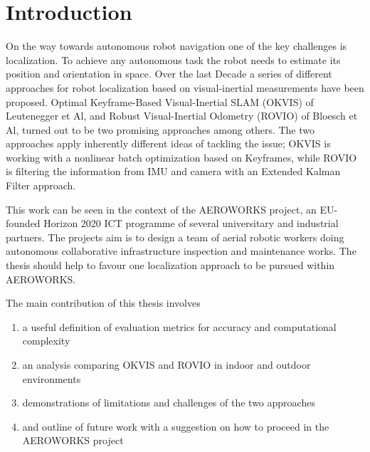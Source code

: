 \chapter{Introduction}
\label{sec:introduction}

On the way towards autonomous robot navigation one of the key challenges is localization. To achieve any autonomous task the robot needs to estimate its position and orientation in space. Over the last Decade a series of different approaches for robot localization based on visual-inertial measurements have been proposed. Optimal Keyframe-Based Visual-Inertial SLAM (OKVIS) of Leutenegger et Al, \cite{leutenegger2013keyframe} \cite{leutenegger2015keyframe} and Robust Visual-Inertial Odometry (ROVIO) of Bloesch et Al, \cite{bloeschrobust} turned out to be two promising approaches among others. The two approaches apply inherently different ideas of tackling the issue; OKVIS is working with a nonlinear batch optimization based on Keyframes, while ROVIO is filtering the information from IMU and camera with an Extended Kalman Filter approach.

This work can be seen in the context of the AEROWORKS project, an EU-founded Horizon 2020 ICT programme of several universitary and industrial partners. The projects aim is to design a team of aerial robotic workers doing autonomous collaborative infrastructure inspection and maintenance works. The thesis should help to favour one localization approach to be pursued within AEROWORKS.

The main contribution of this thesis involves

\begin{enumerate}
\item a useful definition of evaluation metrics for accuracy and computational complexity
\item an analysis comparing OKVIS and ROVIO in indoor and outdoor environments
\item demonstrations of limitations and challenges of the two approaches
\item and outline of future work with a suggestion on how to proceed in the AEROWORKS project
\end{enumerate}